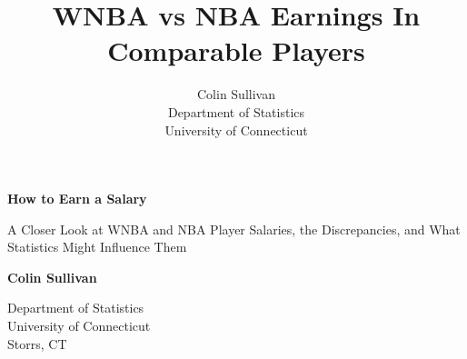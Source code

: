 \documentclass[12pt]{article}
\title{WNBA vs NBA Earnings In Comparable Players}
\author{Colin Sullivan\\
  Department of Statistics\\
  University of Connecticut
}
\begin{document}
   \begin{center}
       \vspace*{1cm}
       \Huge
       \textbf{How to Earn a Salary}

       \Large
       \vspace{0.5cm}
        A Closer Look at WNBA and NBA Player Salaries, the Discrepancies, and What Statistics Might Influence Them
            
       \vspace{1.5cm}

       \textbf{Colin Sullivan}
       
       \vfill


       \vfill
            
            
       \vspace{0.8cm}
     
         
        \Large    
       Department of Statistics\\
       University of Connecticut\\
       Storrs, CT\\
            
   \end{center}
\newpage
\end{document}
